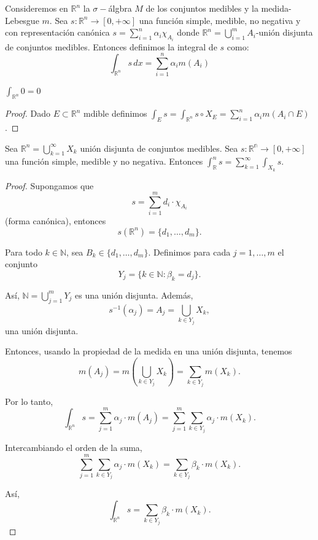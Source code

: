 \begin{definición}
Consideremos en $\mathbb{R}^n$ la $\sigma-$álgbra $M$ de los conjuntos medibles y la medida-Lebesgue $m$. Sea $s: \mathbb{R}^n \to [0, +\infty]$ una función simple, medible, no negativa y con representación canónica $s = \sum_{i = 1}^{n}\alpha_i\chi_{A_i}$ donde $\mathbb{R}^n = \bigcup_{i = 1}^{m}A_i$-unión disjunta de conjuntos medibles. Entonces definimos la integral de $s$ como: \[\int_{\mathbb{R}^n}s \, dx = \sum_{i = 1}^{n}\alpha_im(A_i)\]
\end{definición}
\begin{observación}
$\int_{\mathbb{R}^n}0 = 0$
\end{observación}
\begin{proof}
    Dado $E \subset \mathbb{R}^n$ mdible definimos $\int_{E}s = \int_{\mathbb{R}^n}s\circ X_E = \sum_{i = 1}^{n}\alpha_im(A_i \cap E)$.
\end{proof}
\begin{lema}
    Sea $\mathbb{R}^n = \bigcup_{k = 1}^{\infty}X_k$ unión disjunta de conjuntos medibles. Sea $s: \mathbb{R^n} \to [0, +\infty]$ una función simple, medible y no negativa. Entonces $\int_{\mathbb{R}}^n s = \sum_{k = 1}^{\infty}\int_{X_k}s$.
\end{lema}
\begin{proof}
    Supongamos que
    $$ s = \sum_{i=1}^{m} d_i \cdot \chi_{A_i} $$
    (forma canónica), entonces
    $$ s(\mathbb{R}^n) = \{ d_1, \dots, d_m \}. $$

    Para todo $k \in \mathbb{N}$, sea $B_k \in \{ d_1, \dots, d_m \}$. Definimos
    para cada $j = 1, \dots, m$ el conjunto $$ Y_j = \{ k \in \mathbb{N} : \beta_k
        = d_j \}. $$

    Así, $\mathbb{N} = \bigcup_{j=1}^{m} Y_j$ es una unión disjunta. Además, $$
        s^{-1}(\alpha_j) = A_j = \bigcup_{k \in Y_j} X_k, $$ una unión disjunta.

    Entonces, usando la propiedad de la medida en una unión disjunta, tenemos $$
        m(A_j) = m \left( \bigcup_{k \in Y_j} X_k \right) = \sum_{k \in Y_j} m(X_k). $$

    Por lo tanto, $$ \int_{\mathbb{R}^n} s = \sum_{j=1}^{m} \alpha_j \cdot m(A_j) =
        \sum_{j=1}^{m} \sum_{k \in Y_j} \alpha_j \cdot m(X_k). $$

    Intercambiando el orden de la suma, $$ \sum_{j=1}^{m} \sum_{k \in Y_j} \alpha_j
        \cdot m(X_k) = \sum_{k \in Y_j} \beta_k \cdot m(X_k). $$

    Así, $$ \int_{\mathbb{R}^n} s = \sum_{k \in Y_j} \beta_k \cdot m(X_k). $$
\end{proof}
